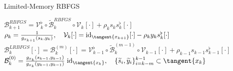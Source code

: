\documentclass[9.4pt]{beamer}
\begin{document}
\begin{frame}{Limited-Memory RBFGS}
    \begin{center}
        $\mathcal{B}^{RBFGS}_{k+1}  = \mathcal{V}^{\flat}_k \circ \widetilde{\mathcal{B}}^{RBFGS}_k \circ \mathcal{V}_k [\cdot] + \rho_k s_k s_k^{\flat} [\cdot]$\\[1.\baselineskip]

        $\rho_k = \frac{1}{g_{x_{k+1}}(s_k, y_k)} , \quad \mathcal{V}_k [\cdot] = \mathrm{id}_{\tangent{x_{k+1}}}[\cdot] - \rho_k y_k s^{\flat}_k [\cdot]$ \\[1.\baselineskip]

        $\mathcal{B}^{LRBFGS}_k [\cdot] = \mathcal{B}^{(m)}_k [\cdot] =  \mathcal{V}^{\flat}_{k-1} \circ \widetilde{\mathcal{B}}^{(m-1)}_k \circ \mathcal{V}_{k-1} [\cdot] + \rho_{k-1} s_{k-1} s_{k-1}^{\flat} [\cdot]$\\[1.\baselineskip]

        $\mathcal{B}^{(0)}_k = \frac{g_{x_k}(s_{k-1}, y_{k-1})}{g_{x_k}(y_{k-1}, y_{k-1})} \; \mathrm{id}_{\tangent{x_k}}, \quad \{ \widetilde{s}_i, \widetilde{y}_i\}_{i=k-m}^{k-1} \subset \tangent{x_k}$
    \end{center}
\end{frame}

\end{document}
